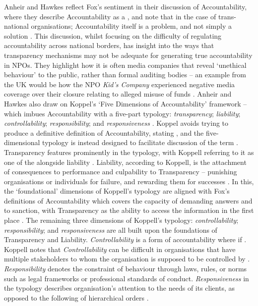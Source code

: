 Anheir and Hawkes reflect Fox's sentiment in their discussion of Accountability, where they describe Accountability as a , and note that in the case of trans-national organisations; Accountability itself is a problem, and not simply a solution \cite{anheier_accountability_2009}. This discussion, whilst focusing on the difficulty of regulating accountability across national borders, has insight into the ways that transparency mechanisms may not be adequate for generating true accountability in NPOs. They highlight how it is often media companies that reveal `unethical behaviour' to the public, rather than formal auditing bodies -- an example from the UK would be how the NPO \textit{Kid's Company} experienced negative media coverage over their closure relating to alleged misuse of funds \cite{elgot_kids_2015, anheier_accountability_2009}. Anheir and Hawkes also draw on Koppel's `Five Dimensions of Accountability' framework -- which imbues Accountability with a five-part typology: \textit{transparency}; \textit{liability}; \textit{controllability}; \textit{responsibility}; and \textit{responsiveness} \cite{anheier_accountability_2009, koppell_pathologies_2005}.
%
Koppel avoids trying to produce a definitive definition of Accountability, stating , and the five-dimensional typology is instead designed to facilitate discussion of the term \cite{koppell_pathologies_2005}. Transparency features prominently in the typology, with Koppell referring to it as one of the  alongside liability \cite{koppell_pathologies_2005}. Liability, according to Koppell, is the attachment of consequences to performance and culpability to Transparency -- punishing organisations or individuals for failure, and rewarding them for successes \cite{koppell_pathologies_2005}. In this, the `foundational' dimensions of Koppell's typology are aligned with Fox's definitions of Accountability which covers the capacity of demanding answers and to sanction, with Transparency as the ability to access the information in the first place \cite{koppell_pathologies_2005, fox_uncertain_2007}.
%
The remaining three dimensions of Koppell's typology: \textit{controllability}; \textit{responsibility}; and \textit{responsiveness} are all built upon the foundations of Transparency and Liability. \textit{Controllability} is a form of accountability where if  \cite{koppell_pathologies_2005}. Koppell notes that \textit{Controllability} can be difficult in organisations that have multiple stakeholders to whom the organisation is supposed to be controlled by \citep{koppell_pathologies_2005}. \textit{Responsibility} denotes the constraint of behaviour through laws, rules, or norms such as legal frameworks or professional standards of conduct. \textit{Responsiveness} in the typology describes organisation's attention to the needs of its clients, as opposed to the following of hierarchical orders \cite{koppell_pathologies_2005}.


